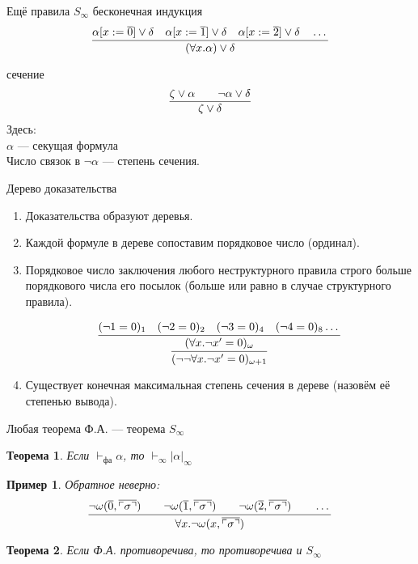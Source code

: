 \documentclass[aspectratio=169]{beamer}
\newtheorem{thm}{Теорема}[section]
\newtheorem{exm}{Пример}[section]
\begin{document}
\begin{frame}{Ещё правила $S_\infty$}
бесконечная индукция
$$\infer{(\forall x.\alpha)\vee\delta}{\alpha[x:=\overline{0}]\vee\delta
                                  \quad\alpha[x:=\overline{1}]\vee\delta
                                  \quad\alpha[x:=\overline{2}]\vee\delta\quad\dots}$$

сечение
$$\infer{\zeta\vee\delta}{\zeta\vee\alpha\quad\quad\neg\alpha\vee\delta}$$
Здесь: \\
$\alpha$ --- секущая формула \\
Число связок в $\neg\alpha$ --- степень сечения.
\end{frame}

\begin{frame}{Дерево доказательства}
\begin{enumerate}
\item Доказательства образуют деревья.
\item Каждой формуле в дереве сопоставим порядковое число (ординал).
\item Порядковое число заключения любого неструктурного правила строго больше порядкового числа его посылок
(больше или равно в случае структурного правила).


$$\infer{(\neg\neg\forall x.\neg x'=0)_{\omega+1}}{\infer{(\forall x.\neg x' = 0)_\omega}{(\neg 1=0)_1\quad (\neg 2=0)_2 \quad (\neg 3=0)_4 \quad (\neg 4 = 0)_8 \dots}}$$

\item Существует конечная максимальная степень сечения в дереве (назовём её степенью вывода).
\end{enumerate}
\end{frame}

\begin{frame}{Любая теорема Ф.А. --- теорема $S_\infty$}
\begin{thm}Если $\vdash_\text{фа}\alpha$, то $\vdash_\infty|\alpha|_\infty$ \end{thm}
\begin{exm}Обратное неверно: $$\infer{\forall x.\neg\omega(x,\overline{\ulcorner\sigma\urcorner})}
{\neg\omega(\overline{0},\overline{\ulcorner\sigma\urcorner})\quad\quad
 \neg\omega(\overline{1},\overline{\ulcorner\sigma\urcorner})\quad\quad
 \neg\omega(\overline{2},\overline{\ulcorner\sigma\urcorner})\quad\quad\dots}$$
\end{exm}
\begin{thm}Если Ф.А. противоречива, то противоречива и $S_\infty$\end{thm}
\end{frame}
\end{document}
